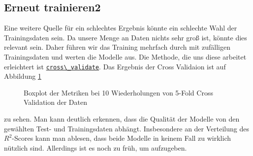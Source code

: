 \documentclass[a4paper,10pt]{scrartcl}
\begin{document}
\subsection{Erneut trainieren2}
Eine weitere Quelle für ein schlechtes Ergebnis könnte ein schlechte Wahl der Trainingsdaten sein. Da unsere Menge an Daten nichts sehr groß ist, könnte dies relevant sein. Daher führen wir das Training mehrfach durch mit zufälligen Trainingsdaten und werten die Modelle aus. Die Methode, die uns diese arbeitet erleichtert ist \href{https://scikit-learn.org/stable/modules/generated/sklearn.model_selection.cross_validate.html}{\lstinline|cross\_validate|}. Das Ergebnis der Cross Validaion ist auf Abbildung \ref{fig:crossval}\begin{figure}
	\centering
	\caption{Boxplot der Metriken bei 10 Wiederholungen von 5-Fold Cross Validation der Daten}
	\label{fig:crossval}
\end{figure} zu sehen. Man kann deutlich erkennen, dass die Qualität der Modelle von den gewählten Test- und Trainingsdaten abhängt. Insbesondere an der Verteilung des $R^2$-Scores kann man ablesen, dass beide Modelle in keinem Fall zu wirklich nützlich sind. Allerdings ist es noch zu früh, um aufzugeben. 
\end{document}
